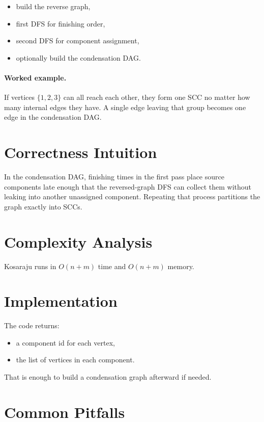 \begin{itemize}
  \item build the reverse graph,
  \item first DFS for finishing order,
  \item second DFS for component assignment,
  \item optionally build the condensation DAG.
\end{itemize}

\paragraph{Worked example.}
If vertices \(\{1,2,3\}\) can all reach each other, they form one SCC no matter how many internal edges they have. A
single edge leaving that group becomes one edge in the condensation DAG.

\section*{Correctness Intuition}

In the condensation DAG, finishing times in the first pass place source components late enough that the reversed-graph
DFS can collect them without leaking into another unassigned component. Repeating that process partitions the graph
exactly into SCCs.

\section*{Complexity Analysis}

Kosaraju runs in \(O(n + m)\) time and \(O(n + m)\) memory.

\section*{Implementation}

The code returns:

\begin{itemize}
  \item a component id for each vertex,
  \item the list of vertices in each component.
\end{itemize}

That is enough to build a condensation graph afterward if needed.

\section*{Common Pitfalls}

